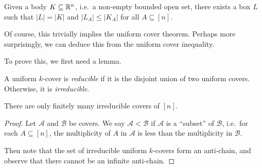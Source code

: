 \documentclass[a4paper]{article}
\begin{document}
\begin{thm}
  Given a body $K \subseteq \mathbb{R}^n$, i.e.\ a non-empty bounded open set, there exists a box $L$ such that $|L| = |K|$ and $|L_A| \leq |K_A|$ for all $A \subseteq [n]$.
\end{thm}
Of course, this trivially implies the uniform cover theorem. Perhaps more surprisingly, we can deduce this from the uniform cover inequality.

To prove this, we first need a lemma.
\begin{defi}
  A uniform $k$-cover is \emph{reducible} if it is the disjoint union of two uniform covers. Otherwise, it is \emph{irreducible}.
\end{defi}

\begin{lemma}
  There are only finitely many irreducible covers of $[n]$.
\end{lemma}

\begin{proof}
  Let $\mathcal{A}$ and $\mathcal{B}$ be covers. We say $\mathcal{A} < \mathcal{B}$ if $\mathcal{A}$ is a ``subset'' of $\mathcal{B}$, i.e.\ for each $A \subseteq [n]$, the multiplicity of $A$ in $\mathcal{A}$ is less than the multiplicity in $\mathcal{B}$.

  Then note that the set of irreducible uniform $k$-covers form an anti-chain, and observe that there cannot be an infinite anti-chain.

%
%
%
%
%
\end{proof}
\end{document}

